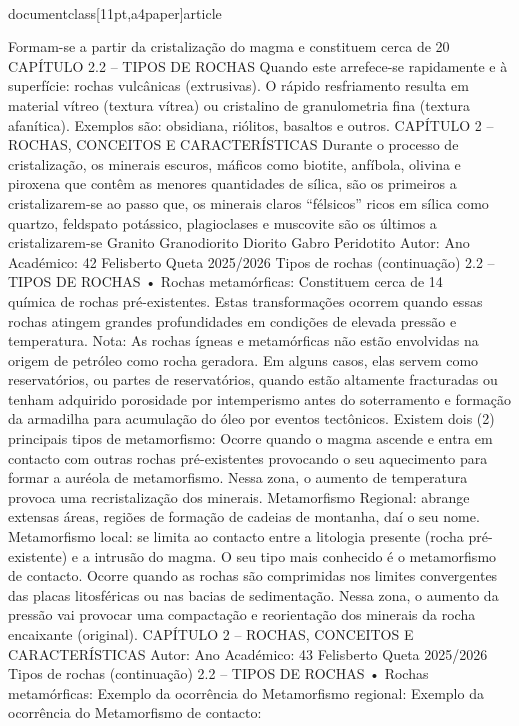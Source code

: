 \\documentclass[11pt,a4paper]{article}
\begin{document}
Formam-se a partir da cristalização do magma e constituem cerca de 20\\%
CAPÍTULO 2.2 – TIPOS DE ROCHAS
Quando este arrefece-se rapidamente e à superfície: rochas vulcânicas (extrusivas).
O rápido resfriamento resulta em material vítreo (textura vítrea) ou cristalino de granulometria fina 
(textura afanítica). Exemplos são: obsidiana, riólitos, basaltos e outros.
CAPÍTULO 2 
–
 ROCHAS, CONCEITOS E CARACTERÍSTICAS
Durante o processo de cristalização, os minerais escuros, máficos como biotite, anfíbola, olivina e piroxena
que contêm as menores quantidades de sílica, são os primeiros a  cristalizarem-se ao passo que, os minerais
claros “félsicos” ricos em sílica como quartzo, feldspato potássico, plagioclases e muscovite são os
últimos a cristalizarem-se
Granito
 Granodiorito
 Diorito
 Gabro
 Peridotito
Autor:
Ano Académico:
42
Felisberto Queta
2025/2026
Tipos de rochas (continuação)
2.2 – TIPOS DE ROCHAS
• Rochas metamórficas:
Constituem cerca de 14\\%
química de rochas pré-existentes. Estas transformações ocorrem quando essas rochas atingem 
grandes profundidades em condições de elevada pressão e temperatura.
Nota: As rochas ígneas e metamórficas não estão envolvidas na origem de petróleo como rocha geradora. Em alguns casos, elas 
servem como reservatórios, ou partes de reservatórios, quando estão altamente fracturadas ou tenham adquirido porosidade por 
intemperismo antes do soterramento e formação da armadilha para acumulação do óleo por eventos tectônicos.
Existem dois (2) principais tipos de metamorfismo: 
Ocorre quando o magma ascende e entra em contacto 
com outras rochas pré-existentes provocando o seu 
aquecimento para formar a auréola de metamorfismo. 
Nessa zona, o aumento de temperatura provoca uma 
recristalização dos minerais.
Metamorfismo Regional: abrange extensas 
áreas, regiões de formação de cadeias de montanha, 
daí o seu nome.
Metamorfismo local: se limita ao contacto entre a 
litologia presente (rocha pré-existente) e a intrusão do 
magma. O seu tipo mais conhecido é o metamorfismo 
de contacto.
Ocorre quando as rochas são comprimidas nos 
limites convergentes das placas litosféricas ou nas 
bacias de sedimentação. Nessa zona, o aumento da 
pressão vai provocar uma compactação e 
reorientação dos minerais da rocha encaixante 
(original).
CAPÍTULO 2 
–
 ROCHAS, CONCEITOS E CARACTERÍSTICAS
Autor:
Ano Académico:
43
Felisberto Queta
2025/2026
Tipos de rochas (continuação)
2.2 – TIPOS DE ROCHAS
• Rochas metamórficas:
Exemplo da ocorrência do 
Metamorfismo regional: 
Exemplo da ocorrência do 
Metamorfismo de contacto:\
\end{document}

